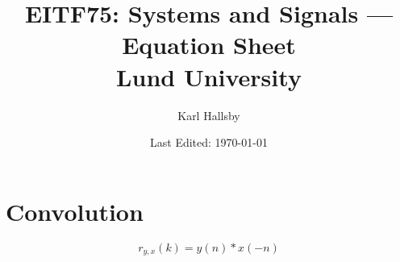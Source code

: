 


% 


\DeclareMathOperator{\TimeDelay}{\mathrm{TD}_{k}}
\DeclareMathOperator{\FoldTime}{\mathrm{FD}}
\DeclareMathOperator{\SignalOperator}{\mathcal{T}}
\DeclareMathOperator{\ZTransformRelation}{\overset{z}{\longleftrightarrow}}
\DeclareMathOperator{\ZTransform}{\mathcal{Z}}
\DeclareMathOperator{\OneSideZTransformRelation}{\overset{z^{+}}{\longleftrightarrow}}
\DeclareMathOperator{\OneSideZTransform}{\mathcal{Z^{+}}}
\DeclareMathOperator{\UnitImpulse}{\delta}
\DeclareMathOperator{\ROC}{\mathrm{ROC}}
\DeclareMathOperator{\FourierTransform}{F}
\DeclareMathOperator{\FourierTransformRelation}{\overset{F}{\longleftrightarrow}}
\DeclareMathOperator{\CircularConvolution}{\circledast}
\DeclareMathOperator{\DFTRelation}{\overset{\text{DFT}}{\underset{N}{\longleftrightarrow}}}

\begin{titlepage}
  \title{EITF75: Systems and Signals --- Equation Sheet \\ Lund University}
  \author{Karl Hallsby}
  \date{Last Edited: \today} %
\end{titlepage}


\section{Convolution}
\begin{equation}\label{eq:Cross_Correlation-Convolution}
  r_{y,x}(k) = y(n) * x(-n)
\end{equation}

